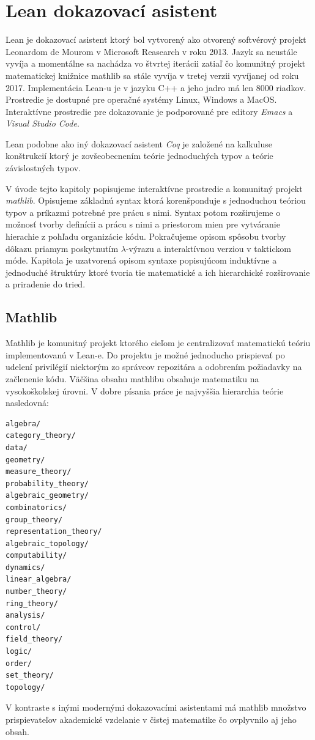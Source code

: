\documentclass[a4paper,10pt,oneside]{report}%
\begin{document}
\chapter{Lean dokazovací asistent}
    Lean je dokazovací asistent ktorý bol vytvorený ako otvorený softvérový projekt
Leonardom de Mourom v Microsoft Reasearch v roku 2013.
    Jazyk sa neustále vyvíja a momentálne sa nachádza vo štvrtej iterácii \cite{lean4}
zatiaľ čo komunitný projekt matematickej knižnice mathlib sa stále vyvíja v tretej
    verzii \cite{lean3} vyvíjanej od roku 2017.
    Implementácia Lean-u je v jazyku C++ a jeho jadro má len 8000 riadkov.
    Prostredie je dostupné pre operačné systémy Linux, Windows a MacOS.
    Interaktívne prostredie pre dokazovanie je podporované pre editory \emph{Emacs} a \emph{Visual Studio Code}.

    Lean podobne ako iný dokazovací asistent \emph{Coq} je založené na kalkuluse konštrukcií ktorý je zovšeobecnením 
teórie jednoduchých typov a teórie závislostných typov.

    V úvode tejto kapitoly popisujeme interaktívne prostredie a komunitný projekt
\emph{mathlib}. Opisujeme základnú syntax ktorá korenšponduje s jednoduchou teóriou
typov a príkazmi potrebné pre prácu s nimi. Syntax potom rozširujeme o možnosť
tvorby definícii a prácu s nimi a priestorom mien pre vytváranie hierachie z pohľadu
organizácie kódu.
    Pokračujeme opisom spôsobu tvorby dôkazu priamym poskytnutím $\lambda$-výrazu
a interaktívnou verziou v taktickom móde.
    Kapitola je uzatvorená opisom syntaxe popisujúcom induktívne a jednoduché
štruktúry ktoré tvoria tie matematické a ich hierarchické rozširovanie a priradenie
do tried.

\section{Mathlib}
    Mathlib je komunitný projekt \cite{mathlib} ktorého cieľom je centralizovať
matematickú teóriu implementovanú v Lean-e.
    Do projektu je možné jednoducho prispievať po udelení privilégií niektorým zo
správcov repozitára a odobrením požiadavky na začlenenie kódu.
    Väčšina obsahu mathlibu obsahuje matematiku na vysokoškolskej úrovni.
    V dobre písania práce je najvyššia hierarchia teórie nasledovná:
\begin{lstlisting}
algebra/
category_theory/
data/
geometry/
measure_theory/
probability_theory/
algebraic_geometry/
combinatorics/
group_theory/
representation_theory/
algebraic_topology/
computability/
dynamics/
linear_algebra/
number_theory/
ring_theory/
analysis/
control/
field_theory/
logic/
order/
set_theory/
topology/
\end{lstlisting}
    V kontraste s inými modernými dokazovacími asistentami má mathlib množstvo
prispievateľov akademické vzdelanie v čistej matematike \cite{mathlib_paper} čo
ovplyvnilo aj jeho obsah.
\end{document}
